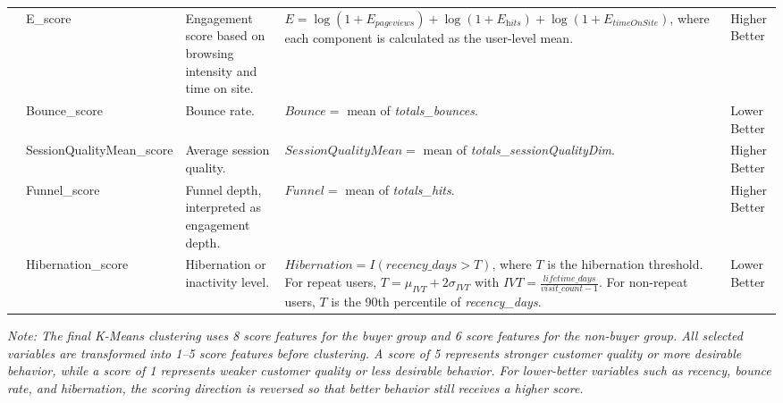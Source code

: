\documentclass[conference]{IEEEtran}
\begin{document}
\begin{table}[H]
\begin{tabularx}{\textwidth}{@{} l l X X l @{}}
& E\_score 
& Engagement score based on browsing intensity and time on site. 
& $E = \log(1+E_{\textit{pageviews}}) + \log(1+E_{\textit{hits}}) + \log(1+E_{\textit{timeOnSite}})$, where each component is calculated as the user-level mean. 
& Higher Better \\

& Bounce\_score 
& Bounce rate. 
& $Bounce =$ mean of \textit{totals\_bounces}. 
& Lower Better \\

& SessionQualityMean\_score 
& Average session quality. 
& $SessionQualityMean =$ mean of \textit{totals\_sessionQualityDim}. 
& Higher Better \\

& Funnel\_score 
& Funnel depth, interpreted as engagement depth. 
& $Funnel =$ mean of \textit{totals\_hits}. 
& Higher Better \\

& Hibernation\_score 
& Hibernation or inactivity level. 
& $Hibernation = I(\textit{recency\_days} > T)$, where $T$ is the hibernation threshold. For repeat users, $T = \mu_{IVT} + 2\sigma_{IVT}$ with $IVT = \frac{\textit{lifetime\_days}}{\textit{visit\_count}-1}$. For non-repeat users, $T$ is the 90th percentile of \textit{recency\_days}. 
& Lower Better \\

\bottomrule
\end{tabularx}
\end{table}

\noindent\textit{Note: The final K-Means clustering uses 8 score features for the buyer group and 6 score features for the non-buyer group. All selected variables are transformed into 1--5 score features before clustering. A score of 5 represents stronger customer quality or more desirable behavior, while a score of 1 represents weaker customer quality or less desirable behavior. For lower-better variables such as recency, bounce rate, and hibernation, the scoring direction is reversed so that better behavior still receives a higher score.}
\end{document}
